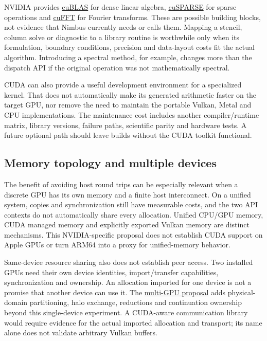 NVIDIA provides
\href{https://docs.nvidia.com/cuda/cublas/index.html}{cuBLAS} for dense linear
algebra, \href{https://docs.nvidia.com/cuda/cusparse/index.html}{cuSPARSE} for
sparse operations and \href{https://docs.nvidia.com/cuda/cufft/index.html}{cuFFT}
for Fourier transforms. These are possible building blocks, not evidence that
Nimbus currently needs or calls them. Mapping a stencil, column solve or
diagnostic to a library routine is worthwhile only when its formulation,
boundary conditions, precision and data-layout costs fit the actual algorithm.
Introducing a spectral method, for example, changes more than the dispatch API
if the original operation was not mathematically spectral.

CUDA can also provide a useful development environment for a specialized
kernel. That does not automatically make its generated arithmetic faster on
the target GPU, nor remove the need to maintain the portable Vulkan, Metal and
CPU implementations. The maintenance cost includes another compiler/runtime
matrix, library versions, failure paths, scientific parity and hardware tests.
A future optional path should leave builds without the CUDA toolkit functional.

\subsection{Memory topology and multiple devices}
The benefit of avoiding host round trips can be especially relevant when a
discrete GPU has its own memory and a finite host interconnect. On a unified
system, copies and synchronization still have measurable costs, and the two API
contexts do not automatically share every allocation. Unified CPU/GPU memory,
CUDA managed memory and explicitly exported Vulkan memory are distinct
mechanisms. This NVIDIA-specific proposal does not establish CUDA support on
Apple GPUs or turn ARM64 into a proxy for unified-memory behavior.

Same-device resource sharing also does not establish peer access. Two installed
GPUs need their own device identities, import/transfer capabilities, synchronization
and ownership. An allocation imported for one device is not a promise that
another device can use it. The
\hyperref[architecture-multigpu]{multi-GPU proposal} adds physical-domain
partitioning, halo exchange, reductions and continuation ownership beyond this
single-device experiment. A CUDA-aware communication library would require
evidence for the actual imported allocation and transport; its name alone does
not validate arbitrary Vulkan buffers.

